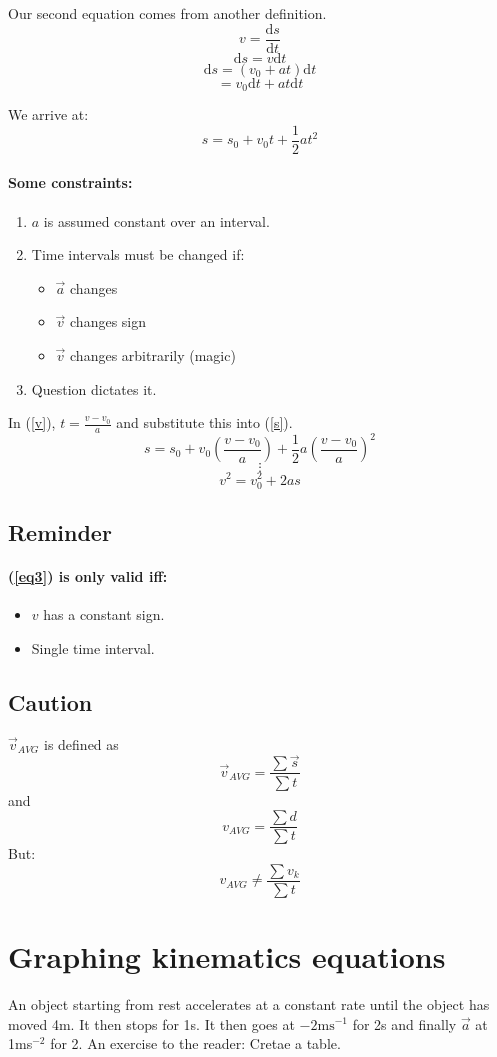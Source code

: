 \documentclass[letterpaper]{article}
\begin{document}
Our second equation comes from another definition.
\[
    v = \frac{\text{d}s}{\text{d}t}
\]
\[
    \text{d}s = v\text{d}t
\]
\[
    \text{d}s = (v_0 + at)\text{d}t
\]
\[
    = v_0\text{d}t + at\text{d}t
\]

We arrive at:
\begin{equation} \label{s}
    s = s_0 + v_0 t + \frac{1}{2}at^2
\end{equation}
\paragraph*{Some constraints:}
\begin{enumerate}
    \item $a$ is assumed constant over an interval.
    \item Time intervals must be changed if:
    \begin{itemize}
        \item $\vec{a}$ changes
        \item $\vec{v}$ changes sign
        \item $\vec{v}$ changes arbitrarily (magic)
    \end{itemize}
    \item Question dictates it.
\end{enumerate}
\newpage
In (\ref{v}), $t = \frac{v - v_0}{a}$ and substitute this into (\ref{s}).
\[
    s = s_0 + v_0 \left(\frac{v - v_0}{a}\right) + 
    \frac{1}{2} a \left( \frac{v - v_0}{a}\right) ^ 2
\]
\[
    \vdots
\]
\begin{equation} \label{eq3}
    v^2 = v_0^2 + 2as
\end{equation}
\subsection{Reminder}
\paragraph*{(\ref{eq3}) is only valid iff:}
    \begin{itemize}
        \item $v$ has a constant sign.
        \item Single time interval.
    \end{itemize}
\subsection{Caution}
$\vec{v}_{AVG}$ is defined as 
\[
\vec{v}_{AVG} = \frac{\sum{\vec{s}}}{\sum{t}}
\]
and
\[
    v_{AVG} = \frac{\sum{d}}{\sum{t}}
\]
But:
\[
    v_{AVG} \neq \frac{\sum{v_k}}{\sum{t}}
\]
\section{Graphing kinematics equations}
An object starting from rest accelerates at a constant rate until
the object has moved 4m. It then stops for 1s.
It then goes at $-2\text{ms}^{-1}$ for 2s and finally $\vec{a}$ at 1ms$^{-2}$
for 2.
An exercise to the reader:
Cretae a table.
\end{document}
